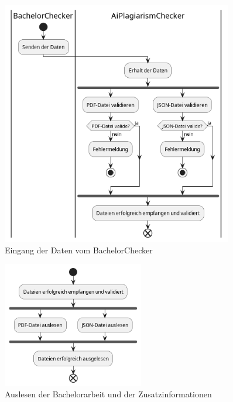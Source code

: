 \begin{figure}[H]
    \centering
    \includegraphics[width=0.9\textwidth]{images/diagrams/bpd/EingangDerDatenVomBachelorChecker/GPD-Eingang der Daten vom BachelorChecker}
    \caption{Eingang der Daten vom BachelorChecker}
    \label{fig:eingangDerDatenVomBachelorChecker}
\end{figure}

\begin{figure}[H]
    \centering
    \includegraphics[width=0.55\textwidth]{images/diagrams/bpd/AuslesenDerBachelorarbeit/GPD-Auslesen der Bachelorarbeit}
    \caption{Auslesen der Bachelorarbeit und der Zusatzinformationen}
    \label{fig:auslesenDerBachelorarbeit}
\end{figure}

